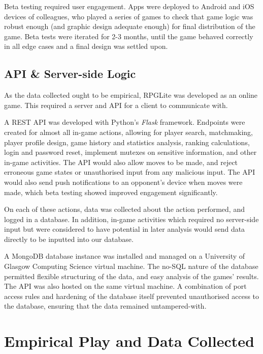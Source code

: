 Beta testing required user engagement. Apps were deployed to Android and iOS
devices of colleagues, who played a series of games to check that game logic was
robust enough (and graphic design adequate enough) for final distribution of the
game. Beta tests were iterated for 2-3 months, until the game behaved correctly
in all edge cases and a final design was settled upon. 


\subsection{API \& Server-side Logic}

As the data collected ought to be empirical, RPGLite was developed as an online
game. This required a server and API for a client to communicate with.

A REST API was developed with Python's \emph{Flask} framework. Endpoints were
created for almost all in-game actions, allowing for player search, matchmaking,
player profile design, game history and statistics analysis, ranking
calculations, login and password reset, implement mutexes on sensitive
information, and other in-game activities. The API would also allow moves to be
made, and reject erroneous game states or unauthorised input from any malicious
input. The API would also send push notifications to an opponent's device when
moves were made, which beta testing showed improved engagement significantly.

On each of these actions, data was collected about the action performed, and
logged in a database. In addition, in-game activities which required no
server-side input but were considered to have potential in later analysis would
send data directly to be inputted into our database.

A MongoDB database instance was installed and managed on a University of Glasgow
Computing Science virtual machine. The no-SQL nature of the database permitted
flexible structuring of the data, and easy analysis of the games' results. The
API was also hosted on the same virtual machine. A combination of port access
rules and hardening of the database itself prevented unauthorised access to the
database, ensuring that the data remained untampered-with.



\section{Empirical Play and Data Collected}

